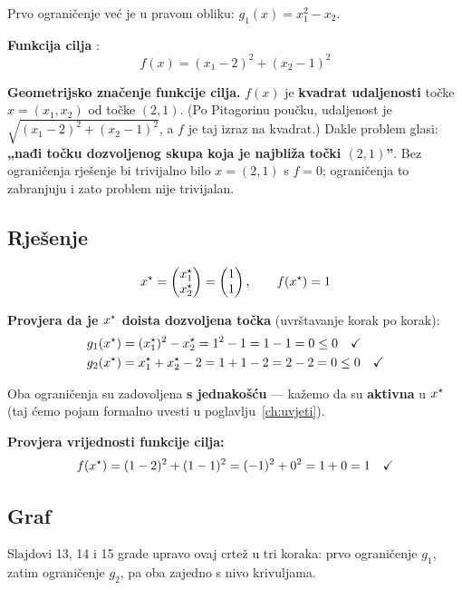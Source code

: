Prvo ograničenje već je u pravom obliku: $g_1(x) = x_1^2 - x_2$.

\textbf{Funkcija cilja} :
\[
f(x) = (x_1 - 2)^2 + (x_2 - 1)^2
\]

\textbf{Geometrijsko značenje funkcije cilja.} $f(x)$ je \textbf{kvadrat
udaljenosti} točke $x = (x_1, x_2)$ od točke $(2, 1)$. (Po Pitagorinu poučku,
udaljenost je $\sqrt{(x_1-2)^2 + (x_2-1)^2}$, a $f$ je taj izraz na kvadrat.)
Dakle problem glasi: \textbf{„nađi točku dozvoljenog skupa koja je najbliža
točki $(2,1)$”}. Bez ograničenja rješenje bi trivijalno bilo $x = (2,1)$ s
$f = 0$; ograničenja to zabranjuju i zato problem nije trivijalan.

\subsection{Rješenje}

\[
x^{\star} = \begin{pmatrix} x_1^{\star} \\ x_2^{\star} \end{pmatrix}
= \begin{pmatrix} 1 \\ 1 \end{pmatrix}, \qquad f(x^{\star}) = 1
\]

\textbf{Provjera da je $x^{\star}$ doista dozvoljena točka} (uvrštavanje korak po
korak):
\begin{align}
g_1(x^{\star}) &= (x_1^{\star})^2 - x_2^{\star} = 1^2 - 1 = 1 - 1 = 0 \le 0 \quad \checkmark\\
g_2(x^{\star}) &= x_1^{\star} + x_2^{\star} - 2 = 1 + 1 - 2 = 2 - 2 = 0 \le 0 \quad \checkmark
\end{align}

Oba ograničenja su zadovoljena \textbf{s jednakošću} --- kažemo da su
\textbf{aktivna} u $x^{\star}$ (taj ćemo pojam formalno uvesti u
poglavlju~\ref{ch:uvjeti}).

\textbf{Provjera vrijednosti funkcije cilja:}
\[
f(x^{\star}) = (1 - 2)^2 + (1 - 1)^2 = (-1)^2 + 0^2 = 1 + 0 = 1 \quad \checkmark
\]

\subsection{Graf}

Slajdovi 13, 14 i 15 grade upravo ovaj crtež u tri koraka: prvo ograničenje
$g_1$, zatim ograničenje $g_2$, pa oba zajedno s nivo krivuljama.

